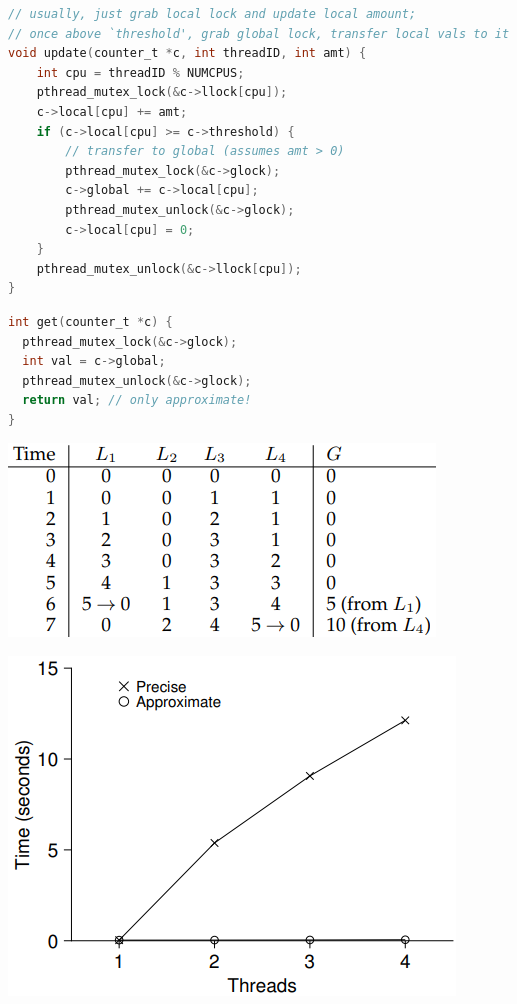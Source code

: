 \documentclass[8pt,a4paper,landscape]{extarticle}
\begin{document}
\begin{multicols*}{3}
\begin{lstlisting}[language=c]
// usually, just grab local lock and update local amount;
// once above `threshold', grab global lock, transfer local vals to it
void update(counter_t *c, int threadID, int amt) {
    int cpu = threadID % NUMCPUS;
    pthread_mutex_lock(&c->llock[cpu]);
    c->local[cpu] += amt;
    if (c->local[cpu] >= c->threshold) {
        // transfer to global (assumes amt > 0)
        pthread_mutex_lock(&c->glock);
        c->global += c->local[cpu];
        pthread_mutex_unlock(&c->glock);
        c->local[cpu] = 0;
    }
    pthread_mutex_unlock(&c->llock[cpu]);
}
\end{lstlisting}
\begin{minipage}{.48\linewidth}
\begin{lstlisting}[language=c]
int get(counter_t *c) {
  pthread_mutex_lock(&c->glock);
  int val = c->global;
  pthread_mutex_unlock(&c->glock);
  return val; // only approximate!
}
\end{lstlisting}
\end{minipage}
\begin{minipage}{.52\linewidth}
  \centering
  \includegraphics[width=.85\linewidth]{imgs/tracing_approx_cnter}
\end{minipage}
\begin{minipage}{.5\linewidth}
  \includegraphics[width=.8\linewidth]{imgs/precise_approx_cnter}

\end{minipage}
\end{multicols*}
\end{document}
